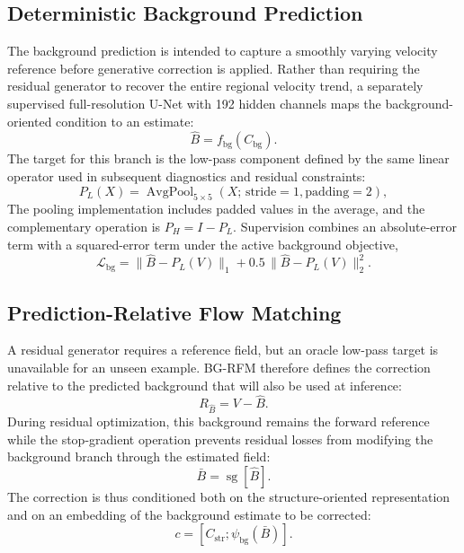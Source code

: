 

\subsection{Deterministic Background Prediction}\label{sec:methods-background}

The background prediction is intended to capture a smoothly varying velocity reference before generative correction is applied. Rather than requiring the residual generator to recover the entire regional velocity trend, a separately supervised full-resolution U-Net \citep{ronneberger2015unet} with 192 hidden channels maps the background-oriented condition to an estimate:
\begin{equation}
\hat B=f_{\mathrm{bg}}(C_{\mathrm{bg}}).
\end{equation}
The target for this branch is the low-pass component defined by the same linear operator used in subsequent diagnostics and residual constraints:
\begin{equation}
P_L(X)=\operatorname{AvgPool}_{5\times5}(X;\,\text{stride}=1,\text{padding}=2),
\end{equation}
The pooling implementation includes padded values in the average, and the complementary operation is $P_H=I-P_L$. Supervision combines an absolute-error term with a squared-error term under the active background objective,
\begin{equation}
\mathcal L_{\mathrm{bg}}
=
\|\hat B-P_L(V)\|_1
+0.5\,\|\hat B-P_L(V)\|_2^2.
\label{eq:bg-loss-final}
\end{equation}
\subsection{Prediction-Relative Flow Matching}\label{sec:methods-residual}

A residual generator requires a reference field, but an oracle low-pass target is unavailable for an unseen example. BG-RFM therefore defines the correction relative to the predicted background that will also be used at inference:
\begin{equation}
R_{\hat B}=V-\hat B.
\label{eq:rs_pred_residual}
\end{equation}
During residual optimization, this background remains the forward reference while the stop-gradient operation prevents residual losses from modifying the background branch through the estimated field:
\begin{equation}
\bar B=\operatorname{sg}[\hat B].
\end{equation}
The correction is thus conditioned both on the structure-oriented representation and on an embedding of the background estimate to be corrected:
\begin{equation}
c=[C_{\mathrm{str}};\psi_{\mathrm{bg}}(\bar B)].
\end{equation}

